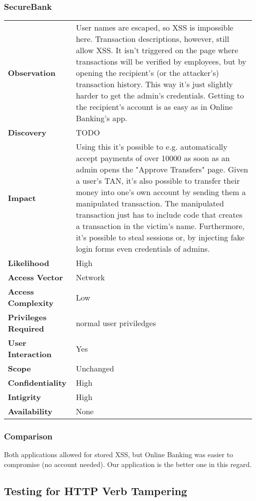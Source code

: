 \subsubsection*{SecureBank}

\begin{tabular}{l|p{10cm}}
\textbf{Observation} & User names are escaped, so XSS is impossible here. Transaction descriptions, however, still allow XSS. It isn't triggered on the page where transactions will be verified by employees, but by opening the recipient's (or the attacker's) transaction history. This way it's just slightly harder to get the admin's credentials. Getting to the recipient's account is as easy as in Online Banking's app. \\
\textbf{Discovery} & TODO \\
\textbf{Impact} & Using this it's possible to e.g. automatically accept payments of over 10000 as soon as an admin opens the "Approve Transfers" page. Given a user's TAN, it's also possible to transfer their money into one's own account by sending them a manipulated transaction. The manipulated transaction just has to include code that creates a transaction in the victim's name. Furthermore, it's possible to steal sessions or, by injecting fake login forms even credentials of admins. \\
\textbf{Likelihood} & High \\
\textbf{Access Vector} & Network \\
\textbf{Access Complexity} & Low\\
\textbf{Privileges Required} & normal user priviledges \\
\textbf{User Interaction} & Yes\\
\textbf{Scope} & Unchanged \\
\textbf{Confidentiality} & High\\
\textbf{Intigrity} & High \\
\textbf{Availability} & None\\
\end{tabular}

\subsubsection*{Comparison}
Both applications allowed for stored XSS, but Online Banking was easier to compromise (no account needed).
Our application is the better one in this regard.

\clearpage


\subsection{Testing for HTTP Verb Tampering}

